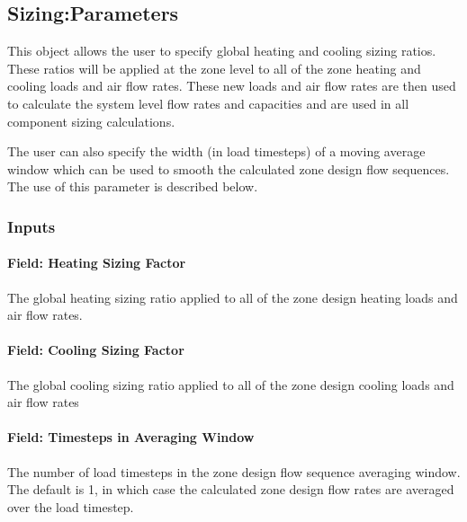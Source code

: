 \subsection{Sizing:Parameters}\label{sizingparameters}

This object allows the user to specify global heating and cooling sizing ratios. These ratios will be applied at the zone level to all of the zone heating and cooling loads and air flow rates. These new loads and air flow rates are then used to calculate the system level flow rates and capacities and are used in all component sizing calculations.

The user can also specify the width (in load timesteps) of a moving average window which can be used to smooth the calculated zone design flow sequences. The use of this parameter is described below.

\subsubsection{Inputs}\label{inputs-2-010}

\paragraph{Field: Heating Sizing Factor}\label{field-heating-sizing-factor}

The global heating sizing ratio applied to all of the zone design heating loads and air flow rates.

\paragraph{Field: Cooling Sizing Factor}\label{field-cooling-sizing-factor}

The global cooling sizing ratio applied to all of the zone design cooling loads and air flow rates

\paragraph{Field: Timesteps in Averaging Window}\label{field-timesteps-in-averaging-window}

The number of load timesteps in the zone design flow sequence averaging window. The default is 1, in which case the calculated zone design flow rates are averaged over the load timestep.

